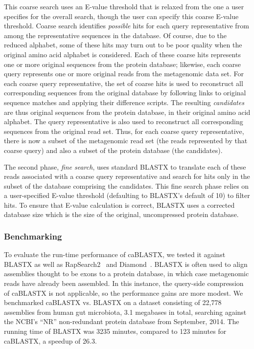 \documentclass[review,preprint,12pt]{elsarticle}
\renewcommand{\cite}{\citep} %
\theoremstyle{definition}
\theoremstyle{remark}
\numberwithin{equation}{section}
\begin{document}
This coarse search uses an E-value threshold that is relaxed from the one a user
specifies for the overall search, though the user can specify this coarse 
E-value threshold.
Coarse search identifies \emph{possible} hits for each query representative from
among the representative sequences in the database.
Of course, due to the reduced alphabet, some of these hits may turn out to be
poor quality when the original amino acid alphabet is considered.
Each of these coarse hits represents one or more original sequences from the
protein database; likewise, each coarse query represents one or more original
reads from the metagenomic data set.
For each coarse query representative, the set of coarse hits is used to
reconstruct all corresponding sequences from the original database by following
links to original sequence matches and applying their difference scripts.
The resulting \emph{candidates} are thus original sequences from the protein
database, in their original amino acid alphabet.
The query representative is also used to reconstruct all corresponding sequences
from the original read set.
Thus, for each coarse query representative, there is now a subset of the
metagenomic read set (the reads represented by that coarse query) and also a
subset of the protein database (the candidates).

The second phase, \emph{fine search}, uses standard BLASTX to translate each
of these reads associated with a coarse query representative and search for
hits only in the subset of the database comprising the candidates.
This fine search phase relies on a user-specified E-value threshold (defaulting
to BLASTX's default of 10) to filter hits.
To ensure that E-value calculation is correct, BLASTX uses a corrected database
size which is the size of the original, uncompressed protein database.

\subsubsection{Benchmarking}

To evaluate the run-time performance of caBLASTX, we tested it against
BLASTX as well as RapSearch2~\cite{zhao2012rapsearch2} and
Diamond~\cite{buchfink2014fast}.
BLASTX is often used to align assemblies thought to be exons to a protein
database, in which case metagenomic reads have already been assembled.
In this instance, the query-side compression of caBLASTX is not applicable, so
the performance gains are more modest.
We benchmarked caBLASTX vs. BLASTX on a dataset consisting of 22,778 assemblies
from human gut microbiota, 3.1 megabases in total, searching against the NCBI's
``NR'' non-redundant protein database from September, 2014.
The running time of BLASTX was 3235 minutes, compared to 123 minutes for caBLASTX, a speedup of 26.3.
\end{document}
